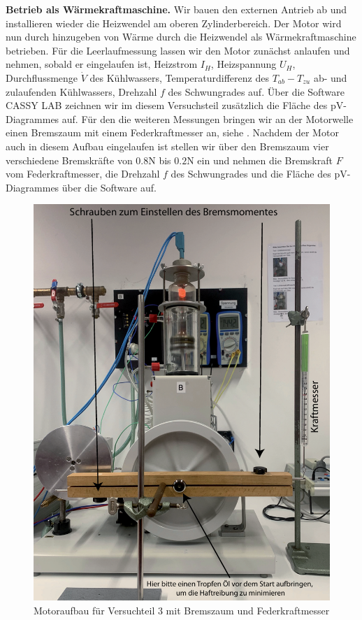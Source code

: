 \textbf{Betrieb als Wärmekraftmaschine.} Wir bauen den externen Antrieb ab und installieren wieder die Heizwendel am oberen Zylinderbereich. Der Motor wird nun durch hinzugeben von Wärme durch die Heizwendel als Wärmekraftmaschine betrieben. Für die Leerlaufmessung lassen wir den Motor zunächst anlaufen und nehmen, sobald er eingelaufen ist, Heizstrom $I_H$, Heizspannung $U_H$, Durchflussmenge $\dot{V}$ des Kühlwassers, Temperaturdifferenz des $T_{ab} - T_{zu}$ ab- und zulaufenden Kühlwassers, Drehzahl $f$ des Schwungrades auf. Über die Software CASSY LAB zeichnen wir im diesem Versuchsteil zusätzlich die Fläche des pV-Diagrammes auf. Für den die weiteren Messungen bringen wir an der Motorwelle einen Bremszaum mit einem Federkraftmesser an, siehe . Nachdem der Motor auch in diesem Aufbau eingelaufen ist stellen wir über den Bremszaum vier verschiedene Bremskräfte von $0.8\si{\newton}$ bis $0.2\si{\newton}$ ein und nehmen die Bremskraft $F$ vom Federkraftmesser, die Drehzahl $f$ des Schwungrades und die Fläche des pV-Diagrammes über die Software auf.

\begin{figure}[H]
  \centering
  \includegraphics[width=.6\textwidth]{files/motor_bremszaum.png}
  \caption{Motoraufbau für Versuchteil 3 mit Bremszaum und Federkraftmesser}
  \label{fig:motor_bremszaum}
\end{figure}